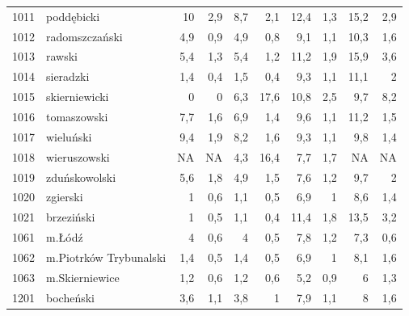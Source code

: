 \begin{center}
\begin{longtable}{lp{3cm}rrrrrrrr}
1011 & poddębicki              & 10      & 2,9         & 8,7      & 2,1          & 12,4     & 1,3          & 15,2     & 2,9          \\
1012 & radomszczański          & 4,9     & 0,9         & 4,9      & 0,8          & 9,1      & 1,1          & 10,3     & 1,6          \\
1013 & rawski                  & 5,4     & 1,3         & 5,4      & 1,2          & 11,2     & 1,9          & 15,9     & 3,6          \\
1014 & sieradzki               & 1,4     & 0,4         & 1,5      & 0,4          & 9,3      & 1,1          & 11,1     & 2            \\
1015 & skierniewicki           & 0       & 0           & 6,3      & 17,6         & 10,8     & 2,5          & 9,7      & 8,2          \\
1016 & tomaszowski             & 7,7     & 1,6         & 6,9      & 1,4          & 9,6      & 1,1          & 11,2     & 1,5          \\
1017 & wieluński               & 9,4     & 1,9         & 8,2      & 1,6          & 9,3      & 1,1          & 9,8      & 1,4          \\
1018 & wieruszowski            & NA      & NA          & 4,3      & 16,4         & 7,7      & 1,7          & NA       & NA           \\
1019 & zduńskowolski           & 5,6     & 1,8         & 4,9      & 1,5          & 7,6      & 1,2          & 9,7      & 2            \\
1020 & zgierski                & 1       & 0,6         & 1,1      & 0,5          & 6,9      & 1            & 8,6      & 1,4          \\
1021 & brzeziński              & 1       & 0,5         & 1,1      & 0,4          & 11,4     & 1,8          & 13,5     & 3,2          \\
1061 & m.Łódź                  & 4       & 0,6         & 4        & 0,5          & 7,8      & 1,2          & 7,3      & 0,6          \\
1062 & m.Piotrków Trybunalski  & 1,4     & 0,5         & 1,4      & 0,5          & 6,9      & 1            & 8,1      & 1,6          \\
1063 & m.Skierniewice          & 1,2     & 0,6         & 1,2      & 0,6          & 5,2      & 0,9          & 6        & 1,3          \\
1201 & bocheński               & 3,6     & 1,1         & 3,8      & 1            & 7,9      & 1,1          & 8        & 1,6          \\

\end{longtable}
\end{center}

